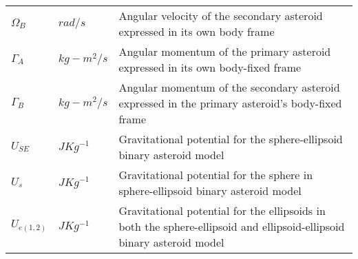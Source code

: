 \begin{longtable}[l]{p{100pt} p{70pt} p{250pt}}
$\Omega_B$		& $rad/s$	& Angular velocity of the secondary asteroid expressed in its own body frame\\
$\Gamma_A$		& $kg-m^2/s$	& Angular momentum of the primary asteroid expressed in its own body-fixed frame\\
$\Gamma_B$		& $kg-m^2/s$	& Angular momentum of the secondary asteroid expressed in the primary asteroid's body-fixed frame\\
$U_{SE}$		& $J Kg^{-1}$		& Gravitational potential for the sphere-ellipsoid binary asteroid model\\
$U_{s}$		& $J Kg^{-1}$		& Gravitational potential for the sphere in sphere-ellipsoid binary asteroid model\\
$U_{e(1,2)}$		& $J Kg^{-1}$		& Gravitational potential for the ellipsoids in both the sphere-ellipsoid and ellipsoid-ellipsoid binary asteroid model\\

\end{longtable}

